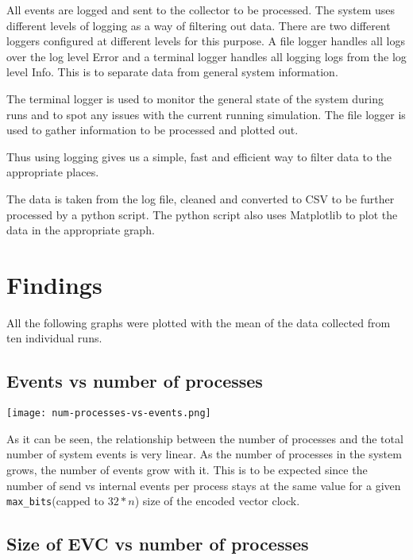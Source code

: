 \documentclass[]{article}
\begin{document}
All events are logged and sent to the collector to be processed. The
system uses different levels of logging as a way of filtering out data.
There are two different loggers configured at different levels for this
purpose. A file logger handles all logs over the log level Error and a
terminal logger handles all logging logs from the log level Info. This
is to separate data from general system information.

The terminal logger is used to monitor the general state of the system
during runs and to spot any issues with the current running simulation.
The file logger is used to gather information to be processed and
plotted out.

Thus using logging gives us a simple, fast and efficient way to filter
data to the appropriate places.

The data is taken from the log file, cleaned and converted to CSV to be
further processed by a python script. The python script also uses
Matplotlib to plot the data in the appropriate graph.

\hypertarget{findings}{%
\section{Findings}\label{findings}}

All the following graphs were plotted with the mean of the data
collected from ten individual runs.

\hypertarget{events-vs-number-of-processes}{%
\subsection{Events vs number of
processes}\label{events-vs-number-of-processes}}

\texttt{[image: num-processes-vs-events.png]}

As it can be seen, the relationship between the number of processes and
the total number of system events is very linear. As the number of
processes in the system grows, the number of events grow with it. This
is to be expected since the number of send vs internal events per
process stays at the same value for a given \texttt{max\_bits}(capped to
\(32 * n\)) size of the encoded vector clock.

\hypertarget{size-of-evc-vs-number-of-processes}{%
\subsection{Size of EVC vs number of
processes}\label{size-of-evc-vs-number-of-processes}}
\end{document}
